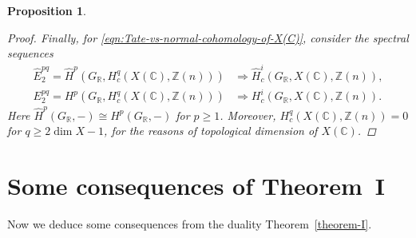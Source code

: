 \documentclass[leqno,12pt]{article}
\theoremstyle{plain}
\newtheorem{proposition}[theorem]{\indent\sc Proposition}
\theoremstyle{definition}
\newcommand{\CC}{\mathbb{C}}
\newcommand{\RR}{\mathbb{R}}
\newcommand{\ZZ}{\mathbb{Z}}
\begin{document}
\begin{proposition}
\begin{proof}
    Finally, for \eqref{eqn:Tate-vs-normal-cohomology-of-X(C)}, consider the
    spectral sequences
    \begin{align*}
      \widehat{E}^{pq}_2 = \widehat{H}^p (G_\RR, H^q_c (X (\CC), \ZZ(n))) & \Longrightarrow
      \widehat{H}^i_c (G_\RR, X (\CC), \ZZ(n)), \\
      E^{pq}_2 = H^p (G_\RR, H^q_c (X (\CC), \ZZ(n))) & \Longrightarrow
      H^i_c (G_\RR, X (\CC), \ZZ(n)).
    \end{align*}
    Here $\widehat{H}^p (G_\RR, -) \cong H^p (G_\RR, -)$ for
    $p \ge 1$. Moreover, $H^q_c (X (\CC), \ZZ(n)) = 0$ for $q \ge {2 \dim X - 1}$,
    for the reasons of topological dimension of $X (\CC)$.
  \end{proof}
\end{proposition}


\section{Some consequences of Theorem~I}
\label{sec:consequences-of-theorem-I}

Now we deduce some consequences from the duality Theorem~\ref{theorem-I}.
\end{document}

